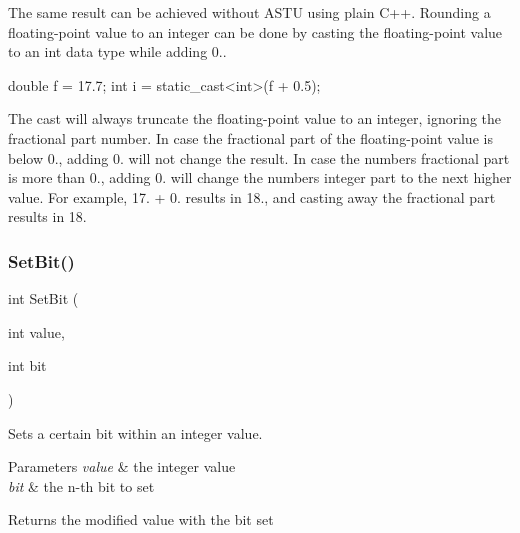 The same result can be achieved without A\+S\+TU using plain C++. Rounding a floating-\/point value to an integer can be done by casting the floating-\/point value to an int data type while adding 0..


\begin{DoxyCode}
\textcolor{keywordtype}{double} f = 17.7;
\textcolor{keywordtype}{int} i = \textcolor{keyword}{static\_cast<}\textcolor{keywordtype}{int}\textcolor{keyword}{>}(f + 0.5);
\end{DoxyCode}


The cast will always truncate the floating-\/point value to an integer, ignoring the fractional part number. In case the fractional part of the floating-\/point value is below 0., adding 0. will not change the result. In case the number\textquotesingle{}s fractional part is more than 0., adding 0. will change the number\textquotesingle{}s integer part to the next higher value. For example, 17. + 0. results in 18., and casting away the fractional part results in 18. \mbox{\label{group__math__group_ga8c8748fbb1d3e99db79f20fc17d4e63b}} 
\subsubsection{\texorpdfstring{Set\+Bit()}{SetBit()}}
{\footnotesize\ttfamily int Set\+Bit (\begin{DoxyParamCaption}\item[{int}]{value,  }\item[{int}]{bit }\end{DoxyParamCaption})}

Sets a certain bit within an integer value.


\begin{DoxyParams}{Parameters}
{\em value} & the integer value \\
\hline
{\em bit} & the n-\/th bit to set \\
\hline
\end{DoxyParams}
\begin{DoxyReturn}{Returns}
the modified value with the bit set 
\end{DoxyReturn}
\mbox{\label{group__math__group_ga9dffb844db4ac8823c6c957448576ed8}} 

